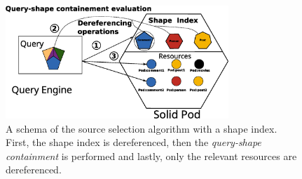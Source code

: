 \begin{figure}
    \centering
    \includegraphics[width=0.75\textwidth]{figure/shape_containement}
    \caption{A schema of the source selection algorithm with a shape index. First, the shape index is dereferenced, 
    then the \emph{query-shape containment} is performed and lastly, only the relevant resources are dereferenced.}
    \label{fig:shape_index}
\end{figure}
